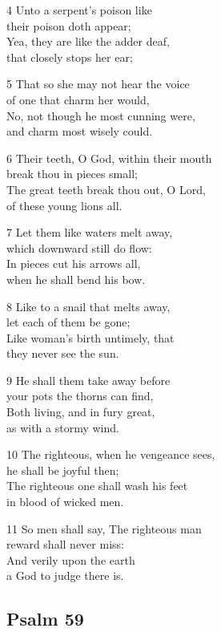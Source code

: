 4 Unto a serpent’s poison like\\
their poison doth appear;\\
Yea, they are like the adder deaf,\\
that closely stops her ear;

5 That so she may not hear the voice\\
of one that charm her would,\\
No, not though he most cunning were,\\
and charm most wisely could.

6 Their teeth, O God, within their mouth\\
break thou in pieces small;\\
The great teeth break thou out, O Lord,\\
of these young lions all.

7 Let them like waters melt away,\\
which downward still do flow:\\
In pieces cut his arrows all,\\
when he shall bend his bow.

8 Like to a snail that melts away,\\
let each of them be gone;\\
Like woman’s birth untimely, that\\
they never see the sun.

9 He shall them take away before\\
your pots the thorns can find,\\
Both living, and in fury great,\\
as with a stormy wind.

10 The righteous, when he vengeance sees,\\
he shall be joyful then;\\
The righteous one shall wash his feet\\
in blood of wicked men.

11 So men shall say, The righteous man\\
reward shall never miss:\\
And verily upon the earth\\
a God to judge there is.

\begin{center}
\quad{}\quad{}
\end{center}

\subsection*{Psalm 59}

